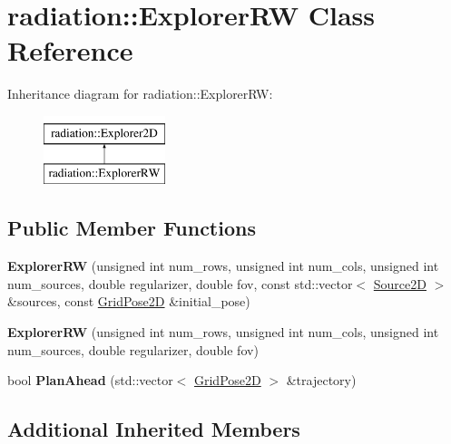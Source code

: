 \hypertarget{classradiation_1_1_explorer_r_w}{}\section{radiation\+:\+:Explorer\+RW Class Reference}
\label{classradiation_1_1_explorer_r_w}
Inheritance diagram for radiation\+:\+:Explorer\+RW\+:\begin{figure}[H]
\begin{center}
\leavevmode
\includegraphics[height=2.000000cm]{classradiation_1_1_explorer_r_w}
\end{center}
\end{figure}
\subsection*{Public Member Functions}
\begin{DoxyCompactItemize}
\item 
\hypertarget{classradiation_1_1_explorer_r_w_aa1ea648af72ebcf4f4b82447545a1756}{}\label{classradiation_1_1_explorer_r_w_aa1ea648af72ebcf4f4b82447545a1756} 
{\bfseries Explorer\+RW} (unsigned int num\+\_\+rows, unsigned int num\+\_\+cols, unsigned int num\+\_\+sources, double regularizer, double fov, const std\+::vector$<$ \hyperlink{classradiation_1_1_source2_d}{Source2D} $>$ \&sources, const \hyperlink{classradiation_1_1_grid_pose2_d}{Grid\+Pose2D} \&initial\+\_\+pose)
\item 
\hypertarget{classradiation_1_1_explorer_r_w_a89a7d007495d2ac43f5863c59b25a97f}{}\label{classradiation_1_1_explorer_r_w_a89a7d007495d2ac43f5863c59b25a97f} 
{\bfseries Explorer\+RW} (unsigned int num\+\_\+rows, unsigned int num\+\_\+cols, unsigned int num\+\_\+sources, double regularizer, double fov)
\item 
\hypertarget{classradiation_1_1_explorer_r_w_a30e8acd62a435a5d424553412f219379}{}\label{classradiation_1_1_explorer_r_w_a30e8acd62a435a5d424553412f219379} 
bool {\bfseries Plan\+Ahead} (std\+::vector$<$ \hyperlink{classradiation_1_1_grid_pose2_d}{Grid\+Pose2D} $>$ \&trajectory)
\end{DoxyCompactItemize}
\subsection*{Additional Inherited Members}



